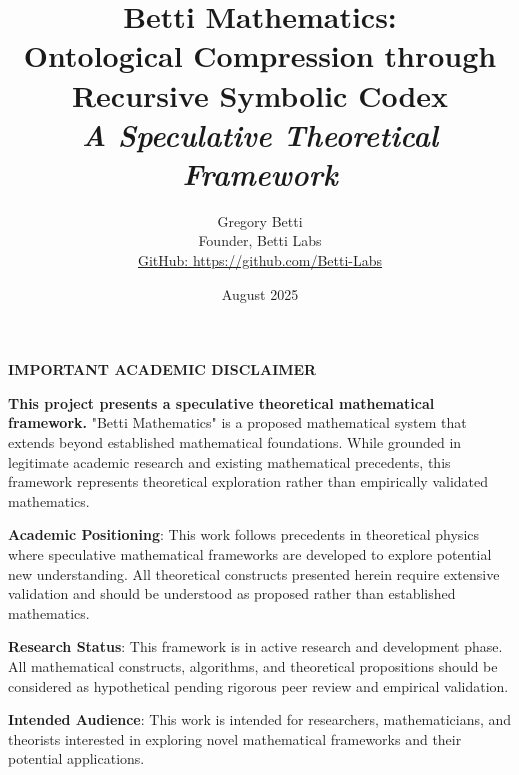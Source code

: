 \documentclass[12pt,a4paper]{book}
\title{
    \Huge\textbf{Betti Mathematics:} \\
    \Large\textbf{Ontological Compression through} \\
    \Large\textbf{Recursive Symbolic Codex} \\
    \vspace{1cm}
    \large\textit{A Speculative Theoretical Framework}
}
\author{
    \Large Gregory Betti \\
    \normalsize Founder, Betti Labs \\
    \normalsize \href{https://github.com/Betti-Labs}{GitHub: https://github.com/Betti-Labs}
}
\date{August 2025}
\begin{document}
\maketitle

\newpage
\thispagestyle{empty}
\vspace*{\fill}
\begin{center}
\textbf{\Large IMPORTANT ACADEMIC DISCLAIMER}
\end{center}
\vspace{1cm}

\textbf{This project presents a speculative theoretical mathematical framework.} "Betti Mathematics" is a proposed mathematical system that extends beyond established mathematical foundations. While grounded in legitimate academic research and existing mathematical precedents, this framework represents theoretical exploration rather than empirically validated mathematics.

\vspace{0.5cm}

\textbf{Academic Positioning}: This work follows precedents in theoretical physics where speculative mathematical frameworks are developed to explore potential new understanding. All theoretical constructs presented herein require extensive validation and should be understood as proposed rather than established mathematics.

\vspace{0.5cm}

\textbf{Research Status}: This framework is in active research and development phase. All mathematical constructs, algorithms, and theoretical propositions should be considered as hypothetical pending rigorous peer review and empirical validation.

\vspace{0.5cm}

\textbf{Intended Audience}: This work is intended for researchers, mathematicians, and theorists interested in exploring novel mathematical frameworks and their potential applications.

\vspace*{\fill}

\newpage
\tableofcontents

\listoffigures

\mainmatter














\backmatter


\end{document}
